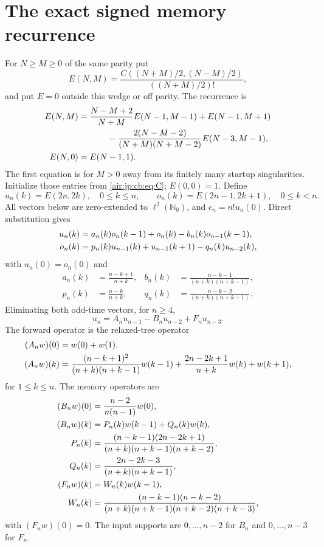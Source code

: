 \documentclass[11pt,letterpaper]{article}
\numberwithin{equation}{section}
\theoremstyle{remark}
\begin{document}
\section{The exact signed memory recurrence}\label{air:jp:cb:sec:memory}
For $N\ge M\ge0$ of the same parity put
\[
 E(N,M)=\frac{C((N+M)/2,(N-M)/2)}{((N+M)/2)!},
\]
and put $E=0$ outside this wedge or off parity. The recurrence is
\begin{align}
 E(N,M)&=\frac{N-M+2}{N+M}E(N-1,M-1)+E(N-1,M+1)\notag\\
 &\hspace{12mm}-\frac{2(N-M-2)}{(N+M)(N+M-2)}E(N-3,M-1),\label{air:jp:cb:eq:walk}\\
 E(N,0)&=E(N-1,1).
\end{align}
The first equation is for $M>0$ away from its finitely many startup singularities. Initialize those entries from \eqref{air:jp:cb:eq:C}; $E(0,0)=1$.
Define
\[
 u_n(k)=E(2n,2k),\quad 0\le k\le n,\qquad
 o_n(k)=E(2n-1,2k+1),\quad0\le k<n.
\]
All vectors below are zero-extended to $\ell^2(\mathbb N_0)$, and $c_n=n!u_n(0)$. Direct substitution gives
\begin{align}
 u_n(k)&=a_n(k)o_n(k-1)+o_n(k)-b_n(k)o_{n-1}(k-1),\label{air:jp:cb:eq:evenodd}\\
 o_n(k)&=p_n(k)u_{n-1}(k)+u_{n-1}(k+1)-q_n(k)u_{n-2}(k),\notag
\end{align}
with $u_n(0)=o_n(0)$ and
\begin{align*}
 a_n(k)&=\frac{n-k+1}{n+k},& b_n(k)&=\frac{n-k-1}{(n+k)(n+k-1)},\\
 p_n(k)&=\frac{n-k}{n+k},&q_n(k)&=\frac{n-k-2}{(n+k)(n+k-1)}.
\end{align*}
Eliminating both odd-time vectors, for $n\ge4$,
\begin{equation}\label{air:jp:cb:eq:even}
 u_n=A_nu_{n-1}-B_nu_{n-2}+F_nu_{n-3}.
\end{equation}
The forward operator is the relaxed-tree operator
\begin{align}
 (A_nw)(0)&=w(0)+w(1),\label{air:jp:cb:eq:A}\\
 (A_nw)(k)&=\frac{(n-k+1)^2}{(n+k)(n+k-1)}w(k-1)
       +\frac{2n-2k+1}{n+k}w(k)+w(k+1),\notag
\end{align}
for $1\le k\le n$. The memory operators are
\begin{align}
 (B_nw)(0)&=\frac{n-2}{n(n-1)}w(0),\label{air:jp:cb:eq:B}\\
 (B_nw)(k)&=P_n(k)w(k-1)+Q_n(k)w(k),\notag\\
 P_n(k)&=\frac{(n-k-1)(2n-2k+1)}{(n+k)(n+k-1)(n+k-2)},\notag\\
 Q_n(k)&=\frac{2n-2k-3}{(n+k)(n+k-1)},\notag\\
 (F_nw)(k)&=W_n(k)w(k-1),\label{air:jp:cb:eq:F}\\
 W_n(k)&=\frac{(n-k-1)(n-k-2)}{(n+k)(n+k-1)(n+k-2)(n+k-3)},\notag
\end{align}
with $(F_nw)(0)=0$. The input supports are $0,\ldots,n-2$ for $B_n$ and $0,\ldots,n-3$ for $F_n$.
\end{document}
